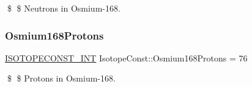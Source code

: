 \$ \$ Neutrons in Osmium-\/168. \mbox{\label{group___isotope_const-_osmium-_os168_ga9915b22efa9ec4072cd34fc0b9313969}} 
\subsubsection{\texorpdfstring{Osmium168\+Protons}{Osmium168Protons}}
{\footnotesize\ttfamily \mbox{\hyperlink{group___isotope_const-_macros_ga5f18360b3e99483a35c32d789e62621c}{I\+S\+O\+T\+O\+P\+E\+C\+O\+N\+S\+T\+\_\+\+I\+NT}} Isotope\+Const\+::\+Osmium168\+Protons = 76}

\$ \$ Protons in Osmium-\/168. 